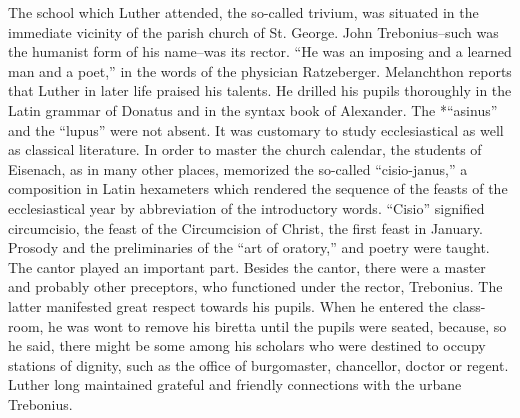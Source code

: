 The school which Luther attended, the so-called trivium, was
situated in the immediate vicinity of the parish church of St. George.
John Trebonius--such was the humanist form of his name--was its
rector. “He was an imposing and a learned man and a poet,” in the
words of the physician Ratzeberger. Melanchthon reports that Luther
in later life praised his talents. He drilled his pupils thoroughly in
the Latin grammar of Donatus and in the syntax book of Alexander.
The *“asinus” and the “lupus” were not absent. It was customary to
study ecclesiastical as well as classical literature. In order to master
the church calendar, the students of Eisenach, as in many other places,
memorized the so-called “cisio-janus,” a composition in Latin hexameters which rendered the sequence of the feasts of the ecclesiastical
year by abbreviation of the introductory words. “Cisio” signified circumcisio, the feast of the Circumcision of Christ, the first feast
in January. Prosody and the preliminaries of the “art of oratory,” and
poetry were taught. The cantor played an important part. Besides
the cantor, there were a master and probably other preceptors, who
functioned under the rector, Trebonius. The latter manifested great
respect towards his pupils. When he entered the class-room, he was
wont to remove his biretta until the pupils were seated, because, so he
said, there might be some among his scholars who were destined to
occupy stations of dignity, such as the office of burgomaster, chancellor, doctor or regent. Luther long maintained grateful and friendly
connections with the urbane Trebonius.

